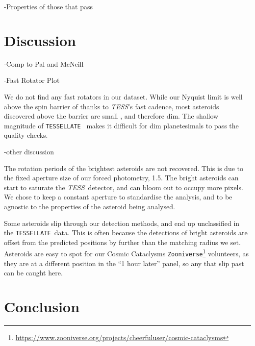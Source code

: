 \documentclass[12pt]{article}
\newcommand{\ttt}{\texttt}
\newcommand{\tess}{\textit{TESS}}
\newcommand{\tessellate}{\texttt{TESSELLATE}}
\begin{document}
-Properties of those that pass


\section{Discussion} \label{sec:Dis}

-Comp to Pal and McNeill

-Fast Rotator Plot

We do not find any fast rotators in our dataset.
While our Nyquist limit is well above the spin barrier of \citet{Pravec2000} thanks to \tess's fast cadence, most asteroids discovered above the barrier are small%
, and therefore dim.
The shallow magnitude of \tessellate\ \citep{TESSELLATE} makes it difficult for dim planetesimals to pass the quality checks.


-other discussion

The rotation periods of the brightest asteroids are not recovered.
This is due to the fixed aperture size of our forced photometry, \qty{1.5}{\px}.
The bright asteroids can start to saturate the \tess\ detector, and can bloom out to occupy more pixels.
We chose to keep a constant aperture to standardise the analysis, and to be agnostic to the properties of the asteroid being analysed.

Some asteroids slip through our detection methods, and end up unclassified in the \tessellate\ data.
This is often because the detections of bright asteroids are offset from the predicted positions by further than the matching radius we set.
Asteroids are easy to spot for our Cosmic Cataclysms \ttt{Zooniverse}\footnote{\url{https://www.zooniverse.org/projects/cheerfuluser/cosmic-cataclysms}} volunteers, as they are at a different position in the ``1 hour later'' panel, so any that slip past can be caught here.


\section{Conclusion}\label{sec:Conc}



\end{document}
